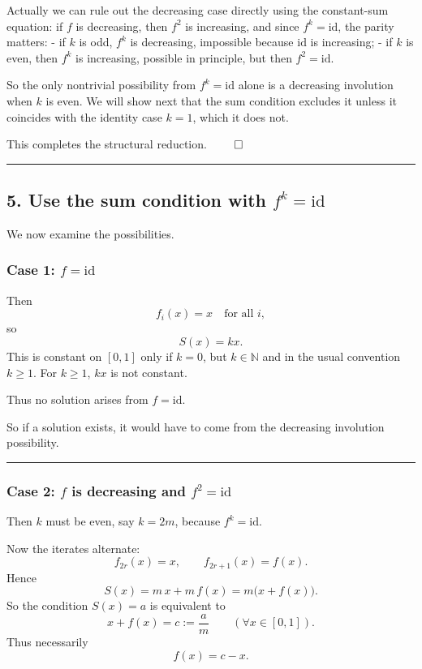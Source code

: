\documentclass[12pt,a4paper]{article}
\begin{document}
Actually we can rule out the decreasing case directly using the constant-sum equation: if \(f\) is decreasing, then \(f^2\) is increasing, and since \(f^k=\mathrm{id}\), the parity matters:
- if \(k\) is odd, \(f^k\) is decreasing, impossible because \(\mathrm{id}\) is increasing;
- if \(k\) is even, then \(f^k\) is increasing, possible in principle, but then \(f^2=\mathrm{id}\).

So the only nontrivial possibility from \(f^k=\mathrm{id}\) alone is a decreasing involution when \(k\) is even. We will show next that the sum condition excludes it unless it coincides with the identity case \(k=1\), which it does not.

This completes the structural reduction. $\qed$


\medskip\hrule\medskip


\subsection*{5. Use the sum condition with \(f^k=\mathrm{id}\)}

We now examine the possibilities.

\subsubsection*{Case 1: \(f=\mathrm{id}\)}

Then
\[
f_i(x)=x \quad \text{for all }i,
\]
so
\[
S(x)=kx.
\]
This is constant on \([0,1]\) only if \(k=0\), but \(k\in\mathbb N\) and in the usual convention \(k\ge1\). For \(k\ge1\), \(kx\) is not constant.

Thus no solution arises from \(f=\mathrm{id}\).

So if a solution exists, it would have to come from the decreasing involution possibility.


\medskip\hrule\medskip


\subsubsection*{Case 2: \(f\) is decreasing and \(f^2=\mathrm{id}\)}

Then \(k\) must be even, say \(k=2m\), because \(f^k=\mathrm{id}\).

Now the iterates alternate:
\[
f_{2r}(x)=x,\qquad f_{2r+1}(x)=f(x).
\]
Hence
\[
S(x)=m\,x+m\,f(x)=m\bigl(x+f(x)\bigr).
\]
So the condition \(S(x)=a\) is equivalent to
\[
x+f(x)=c:=\frac a m \qquad (\forall x\in[0,1]).
\]
Thus necessarily
\[
f(x)=c-x.
\]
\end{document}
